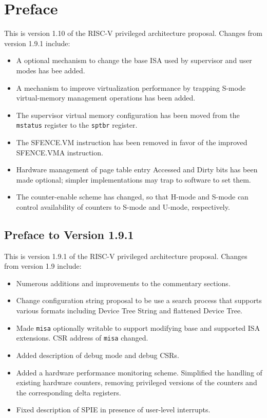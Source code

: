 \chapter{Preface}

This is version 1.10 of the RISC-V privileged architecture
proposal.  Changes from version 1.9.1 include:

\begin{itemize}
  \parskip 0pt
  \itemsep 1pt
\item A optional mechanism to change the base ISA used by supervisor and user
      modes has bee added.
\item A mechanism to improve virtualization performance by
      trapping S-mode virtual-memory management operations has been added.
\item The supervisor virtual memory configuration has been moved from the
      {\tt mstatus} register to the {\tt sptbr} register.
\item The SFENCE.VM instruction has been removed in favor of the improved
      SFENCE.VMA instruction.
\item Hardware management of page table entry Accessed and Dirty bits has
      been made optional; simpler implementations may trap to software to
      set them.
\item The counter-enable scheme has changed, so that H-mode and S-mode can
      control availability of counters to S-mode and U-mode, respectively.
\end{itemize}

\section*{Preface to Version 1.9.1}

This is version 1.9.1 of the RISC-V privileged architecture
proposal.  Changes from version 1.9 include:

\begin{itemize}
  \parskip 0pt
  \itemsep 1pt
\item Numerous additions and improvements to the commentary sections.
\item Change configuration string proposal to be use a search process
  that supports various formats including Device Tree String and
  flattened Device Tree.
\item Made {\tt misa} optionally writable to support modifying base
  and supported ISA extensions.  CSR address of {\tt misa} changed.
\item Added description of debug mode and debug CSRs.
\item Added a hardware performance monitoring scheme.  Simplified the
  handling of existing hardware counters, removing privileged versions
  of the counters and the corresponding delta registers.
\item Fixed description of SPIE in presence of user-level interrupts.
\end{itemize}
